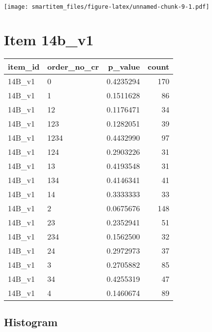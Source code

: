 \documentclass[]{book}
\newenvironment{Shaded}{\begin{snugshade}}{\end{snugshade}}
\newcommand{\KeywordTok}[1]{\textcolor[rgb]{0.13,0.29,0.53}{\textbf{#1}}}
\newcommand{\StringTok}[1]{\textcolor[rgb]{0.31,0.60,0.02}{#1}}
\newcommand{\OperatorTok}[1]{\textcolor[rgb]{0.81,0.36,0.00}{\textbf{#1}}}
\newcommand{\NormalTok}[1]{#1}
\theoremstyle{definition}
\theoremstyle{definition}
\theoremstyle{definition}
\theoremstyle{remark}
\begin{document}
\texttt{[image: smartitem\_files/figure-latex/unnamed-chunk-9-1.pdf]}

\section{Item 14b\_v1}\label{item-14b_v1-1}

\begin{Shaded}
\end{Shaded}

\begin{tabular}{l|l|r|r}
\hline
item\_id & order\_no\_cr & p\_value & count\\
\hline
14B\_v1 & 0 & 0.4235294 & 170\\
\hline
14B\_v1 & 1 & 0.1511628 & 86\\
\hline
14B\_v1 & 12 & 0.1176471 & 34\\
\hline
14B\_v1 & 123 & 0.1282051 & 39\\
\hline
14B\_v1 & 1234 & 0.4432990 & 97\\
\hline
14B\_v1 & 124 & 0.2903226 & 31\\
\hline
14B\_v1 & 13 & 0.4193548 & 31\\
\hline
14B\_v1 & 134 & 0.4146341 & 41\\
\hline
14B\_v1 & 14 & 0.3333333 & 33\\
\hline
14B\_v1 & 2 & 0.0675676 & 148\\
\hline
14B\_v1 & 23 & 0.2352941 & 51\\
\hline
14B\_v1 & 234 & 0.1562500 & 32\\
\hline
14B\_v1 & 24 & 0.2972973 & 37\\
\hline
14B\_v1 & 3 & 0.2705882 & 85\\
\hline
14B\_v1 & 34 & 0.4255319 & 47\\
\hline
14B\_v1 & 4 & 0.1460674 & 89\\
\hline
\end{tabular}

\subsection{Histogram}\label{histogram-3}
\end{document}
